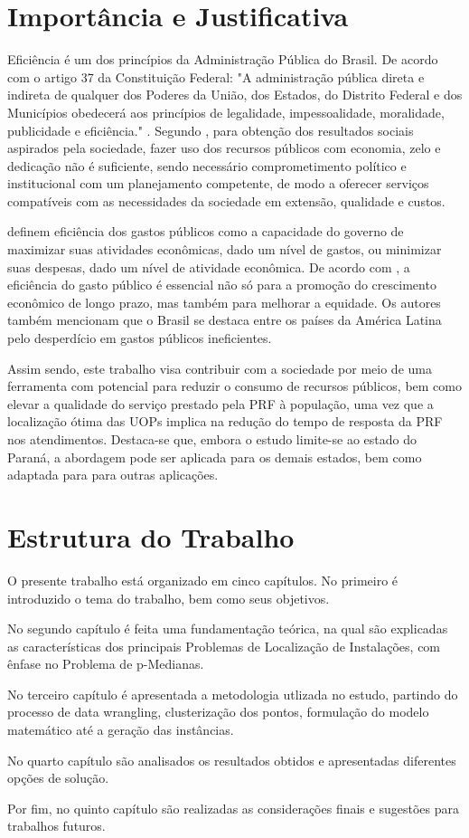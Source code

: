 \section{Importância e Justificativa}

Eficiência é um dos princípios da Administração Pública do Brasil. De acordo com o artigo 37 da Constituição Federal: "A administração pública direta e indireta de qualquer dos Poderes da União, dos Estados, do Distrito Federal e dos Municípios obedecerá aos princípios de legalidade, impessoalidade, moralidade, publicidade e eficiência." \;\textcite{Brasil1988_gambiarra}. Segundo \textcite{Morais2009}, para obtenção dos resultados sociais aspirados pela sociedade, fazer uso dos recursos públicos com economia, zelo e dedicação não é suficiente, sendo necessário comprometimento político e institucional com um planejamento competente, de modo a oferecer serviços compatíveis com as necessidades da sociedade em extensão, qualidade e custos.

\textcite{Chan2012} definem eficiência dos gastos públicos como a capacidade do governo de maximizar suas atividades econômicas, dado um nível de gastos, ou minimizar suas despesas, dado um nível de atividade econômica. De acordo com \textcite{Izquierdo2018}, a eficiência do gasto público é essencial não só para a promoção do crescimento econômico de longo prazo, mas também para melhorar a equidade. Os autores também mencionam que o Brasil se destaca entre os países da América Latina pelo desperdício em gastos públicos ineficientes.

Assim sendo, este trabalho visa contribuir com a sociedade por meio de uma ferramenta com potencial para reduzir o consumo de recursos públicos, bem como elevar a qualidade do serviço prestado pela PRF à população, uma vez que a localização ótima das UOPs implica na redução do tempo de resposta da PRF nos atendimentos. Destaca-se que, embora o estudo limite-se ao estado do Paraná, a abordagem pode ser aplicada para os demais estados, bem como adaptada para para outras aplicações.

\section{Estrutura do Trabalho}

O presente trabalho está organizado em cinco capítulos. No primeiro é introduzido o tema do trabalho, bem como seus objetivos.

No segundo capítulo é feita uma fundamentação teórica, na qual são explicadas as características dos principais Problemas de Localização de Instalações, com ênfase no Problema de p-Medianas.

No terceiro capítulo é apresentada a metodologia utlizada no estudo, partindo do processo de data wrangling, clusterização dos pontos, formulação do modelo matemático até a geração das instâncias.

No quarto capítulo são analisados os resultados obtidos e apresentadas diferentes opções de solução.

Por fim, no quinto capítulo são realizadas as considerações finais e sugestões para trabalhos futuros.


